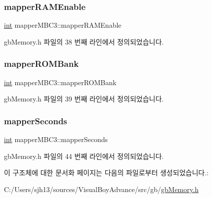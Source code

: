 \subsubsection{\texorpdfstring{mapper\+R\+A\+M\+Enable}{mapperRAMEnable}}
{\footnotesize\ttfamily \mbox{\hyperlink{_util_8cpp_a0ef32aa8672df19503a49fab2d0c8071}{int}} mapper\+M\+B\+C3\+::mapper\+R\+A\+M\+Enable}



gb\+Memory.\+h 파일의 38 번째 라인에서 정의되었습니다.

\mbox{\label{structmapper_m_b_c3_a7a2bf68415cbdab5212e896b4387a1a2}} 
\subsubsection{\texorpdfstring{mapper\+R\+O\+M\+Bank}{mapperROMBank}}
{\footnotesize\ttfamily \mbox{\hyperlink{_util_8cpp_a0ef32aa8672df19503a49fab2d0c8071}{int}} mapper\+M\+B\+C3\+::mapper\+R\+O\+M\+Bank}



gb\+Memory.\+h 파일의 39 번째 라인에서 정의되었습니다.

\mbox{\label{structmapper_m_b_c3_a9a361b45b036291bc6b6eaa8f612d3e0}} 
\subsubsection{\texorpdfstring{mapper\+Seconds}{mapperSeconds}}
{\footnotesize\ttfamily \mbox{\hyperlink{_util_8cpp_a0ef32aa8672df19503a49fab2d0c8071}{int}} mapper\+M\+B\+C3\+::mapper\+Seconds}



gb\+Memory.\+h 파일의 44 번째 라인에서 정의되었습니다.



이 구조체에 대한 문서화 페이지는 다음의 파일로부터 생성되었습니다.\+:\begin{DoxyCompactItemize}
\item 
C\+:/\+Users/sjh13/sources/\+Visual\+Boy\+Advance/src/gb/\mbox{\hyperlink{gb_memory_8h}{gb\+Memory.\+h}}\end{DoxyCompactItemize}
